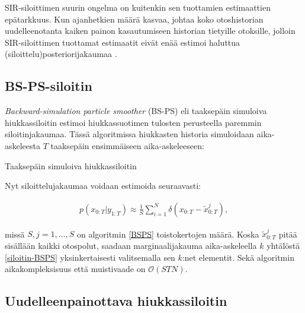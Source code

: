 \documentclass[
  12pt,
  a4paper, twoside]{book}
\begin{document}
SIR-siloittimen suurin ongelma on kuitenkin sen tuottamien estimaattien epätarkkuus. Kun ajanhetkien määrä kasvaa, johtaa koko otoshistorian uudelleenotanta kaiken painon kasautumiseen historian tietyille otoksille, jolloin SIR-siloittimen tuottamat estimaatit eivät enää estimoi haluttua (siloittelu)posteriorijakaumaa \citep{kitagawa-1996}.

\subsection{BS-PS-siloitin}

\emph{Backward-simulation particle smoother} (BS-PS) eli taaksepäin simuloiva hiukkassiloitin estimoi hiukkassuotimen tulosten perusteella paremmin siloitinjakaumaa. Tässä algoritmissa hiukkasten historia simuloidaan aika-askeleesta \(T\) taaksepäin ensimmäiseen aika-askeleeseen:

\begin{algorithm}[H]
\label{BSPS}
\DontPrintSemicolon
\SetAlgoShortEnd
{}
\caption{Taaksepäin simuloiva hiukkassiloitin}
\end{algorithm}

Nyt siloittelujakaumaa voidaan estimoida seuraavasti:

\begin{align}\label{siloitin-BSPS}
p(x_{0:T}|y_{1:T}) \approx \frac{1}{S} \sum_{i=1}^N \delta (x_{0:T}-\tilde{x}_{0:T}^j),
\end{align}

missä \(S, j=1,\ldots,S\) on algoritmin \ref{BSPS} toistokertojen määrä. Koska \(\tilde{x}_{0:T}^j\) pitää sisällään kaikki otospolut, saadaan marginaalijakauma aika-askeleella \(k\) yhtälöstä \ref{siloitin-BSPS} yksinkertaisesti valitsemalla sen \(k\):net elementit. Sekä algoritmin aikakompleksisuus että muistivaade on \(\mathcal{O}(STN)\).

\subsection{Uudelleenpainottava hiukkassiloitin}
\end{document}
